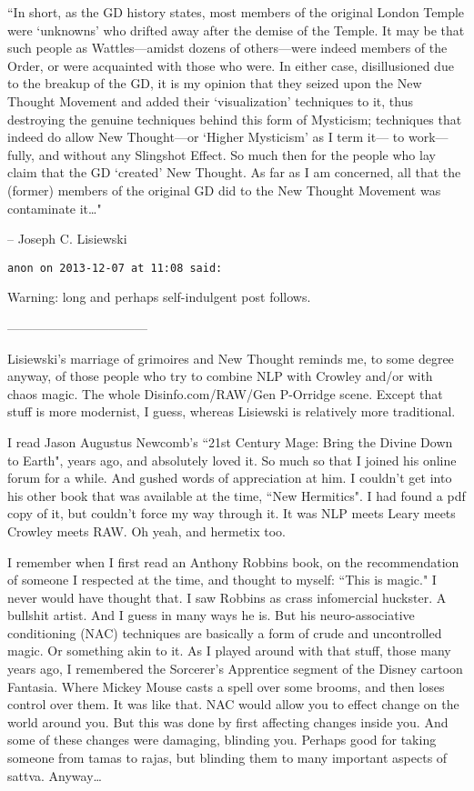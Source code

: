 \begin{footnotesize}
\begin{sffamily}
``In short, as the GD history states, most members of the original London Temple were `unknowns' who drifted away after the demise of the Temple. It may be that such people as Wattles—amidst dozens of others—were indeed members of the Order, or were acquainted with those who were. In either case, disillusioned due to the breakup of the GD, it is my opinion that they seized upon the New Thought Movement and added their `visualization' techniques to it, thus destroying the genuine techniques behind this form of Mysticism; techniques that indeed do allow New Thought—or `Higher Mysticism' as I term it— to work—fully, and without any Slingshot Effect. So much then for the people who lay claim that the GD `created' New Thought. As far as I am concerned, all that the (former) members of the original GD did to the New Thought Movement was contaminate it…"

– Joseph C. Lisiewski


\hfill

\texttt{anon on 2013-12-07 at 11:08 said: }

Warning: long and perhaps self-indulgent post follows.

———————————

Lisiewski's marriage of grimoires and New Thought reminds me, to some degree anyway, of those people who try to combine NLP with Crowley and/or with chaos magic. The whole Disinfo.com/RAW/Gen P-Orridge scene. Except that stuff is more modernist, I guess, whereas Lisiewski is relatively more traditional.

I read Jason Augustus Newcomb's ``21st Century Mage: Bring the Divine Down to Earth", years ago, and absolutely loved it. So much so that I joined his online forum for a while. And gushed words of appreciation at him. I couldn't get into his other book that was available at the time, ``New Hermitics". I had found a pdf copy of it, but couldn't force my way through it. It was NLP meets Leary meets Crowley meets RAW. Oh yeah, and hermetix too.

I remember when I first read an Anthony Robbins book, on the recommendation of someone I respected at the time, and thought to myself: ``This is magic." I never would have thought that. I saw Robbins as crass infomercial huckster. A bullshit artist. And I guess in many ways he is. But his neuro-associative conditioning (NAC) techniques are basically a form of crude and uncontrolled magic. Or something akin to it. As I played around with that stuff, those many years ago, I remembered the Sorcerer's Apprentice segment of the Disney cartoon Fantasia. Where Mickey Mouse casts a spell over some brooms, and then loses control over them. It was like that. NAC would allow you to effect change on the world around you. But this was done by first affecting changes inside you. And some of these changes were damaging, blinding you. Perhaps good for taking someone from tamas to rajas, but blinding them to many important aspects of sattva. Anyway…


\end{sffamily}
\end{footnotesize}
